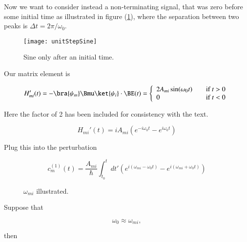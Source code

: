 Now we want to consider instead a non-terminating signal, that was zero before some initial time as illustrated in figure (\ref{fig:qmTwoL9:unitStepSine}), where the separation between two peaks is $\Delta t = 2\pi/\omega_0$.

\begin{figure}[htp]
   \centering
   \texttt{[image: unitStepSine]}
   \caption{Sine only after an initial time.}\label{fig:qmTwoL9:unitStepSine}
\end{figure}

Our matrix element is 

\begin{equation}\label{eqn:qmTwoL9:470}
H_{mi}'(t) = - \bra{\psi_m} \Bmu \ket{\psi_i} \cdot \BE(t) = 
\left\{
\begin{array}{l l}
2 A_{mi} \sin(\omega_0 t) & \quad \mbox{if $t > 0$} \\
0 & \quad \mbox{if $t < 0$} \\
\end{array}
\right.
\end{equation}

Here the factor of 2 has been included for consistency with the text.

\begin{equation}\label{eqn:qmTwoL9:490}
H_{mi}'(t) = i A_{mi} 
\left( 
e^{-i \omega_0 t}
-e^{i \omega_0 t} 
\right)
\end{equation}

Plug this into the perturbation

\begin{equation}\label{eqn:qmTwoL9:510}
c_m^{(1)}(t) = 
\frac{A_{mi}}{\hbar} \int_{t_0}^t dt' 
\left( 
e^{i (\omega_{mi} - \omega_0 t) }
-e^{i (\omega_{mi} + \omega_0 t) }
\right)
\end{equation}

\begin{figure}[htp]
   \centering
   \def\svgwidth{0.3\columnwidth}
   
   \caption{$\omega_{mi}$ illustrated.}\label{fig:qmTwoL9:6}
\end{figure}

Suppose that

\begin{equation}\label{eqn:qmTwoL9:530}
\omega_0 \approx \omega_{mi},
\end{equation}

then

